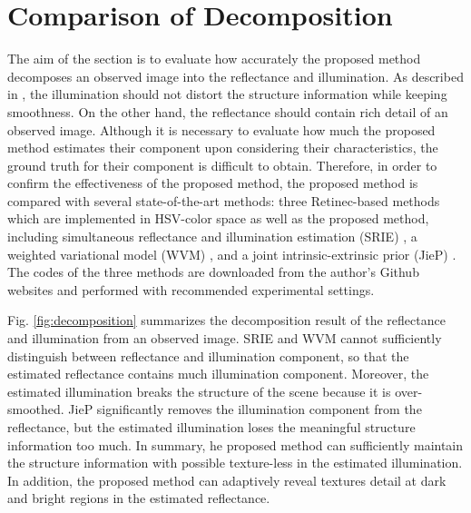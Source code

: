 \section{Comparison of Decomposition} \label{sec:decomposition}
The aim of the section is to evaluate how accurately the proposed method decomposes an observed image into the reflectance and illumination. As described in \cite{retinex}, the illumination should not distort the structure information while keeping smoothness. On the other hand, the reflectance should contain rich detail of an observed image. Although it is necessary to evaluate how much the proposed method estimates their component upon considering their characteristics, the ground truth for their component is difficult to obtain. Therefore, in order to confirm the effectiveness of the proposed method, the proposed method is compared with several state-of-the-art methods: three Retinec-based methods which are implemented in HSV-color space as well as the proposed method, including simultaneous reflectance and illumination estimation (SRIE) \cite{srie}, a weighted variational model (WVM) \cite{wvm}, and a joint intrinsic-extrinsic prior (JieP) \cite{jiep}. The codes of the three methods are downloaded from the author's Github websites and performed with recommended experimental settings.\par
Fig. \ref{fig:decomposition} summarizes the decomposition result of the reflectance and illumination from an observed image. 
SRIE and WVM cannot sufficiently distinguish between reflectance and illumination component, so that the estimated reflectance contains much illumination component. 
Moreover, the estimated illumination breaks the structure of the scene because it is over-smoothed. 
JieP significantly removes the illumination component from the reflectance, but the estimated illumination loses the meaningful structure information too much. 
In summary, he proposed method can sufficiently maintain the structure information with possible texture-less in the estimated illumination. In addition, the proposed method can adaptively reveal textures detail at dark and bright regions in the estimated reflectance.
